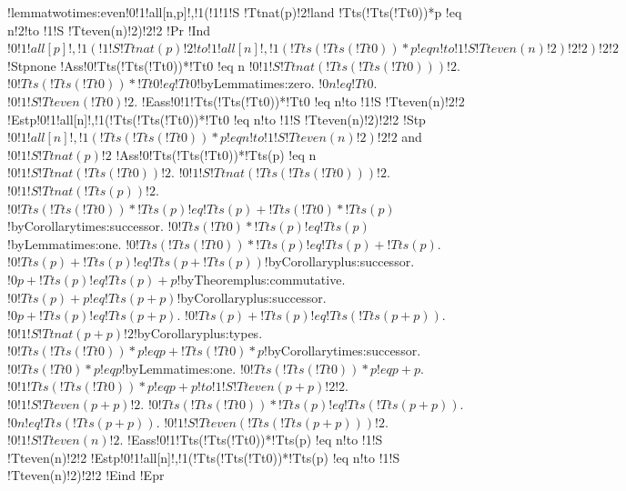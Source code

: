!lemma{twotimes:even}{!0!1!all[n,p]!,!1(!1!1!S !Tt{nat}(p)!2!land !Tt{s}(!Tt{s}(!Tt{0}))*p !eq n!2!to !1!S !Tt{even}(n)!2)!2!2}
!Pr{
!Ind{$!0!1!all[p]!,!1(!1!S !Tt{nat}(p)!2!to !1!all[n]!,!1(!Tt{s}(!Tt{s}(!Tt{0}))*p !eq n!to !1!S !Tt{even}(n)!2)!2!2)!2!2$}
!Stp{none}
!Ass{!0!Tt{s}(!Tt{s}(!Tt{0}))*!Tt{0} !eq n}
$!0!1!S !Tt{nat}(!Tt{s}(!Tt{s}(!Tt{0})))!2$.
$!0!Tt{s}(!Tt{s}(!Tt{0}))*!Tt{0} !eq !Tt{0}$!by{Lemma}{times:zero}.
$!0n !eq !Tt{0}$.
$!0!1!S !Tt{even}(!Tt{0})!2$.
!Eass{!0!1!Tt{s}(!Tt{s}(!Tt{0}))*!Tt{0} !eq n!to !1!S !Tt{even}(n)!2!2}
!Estp{!0!1!all[n]!,!1(!Tt{s}(!Tt{s}(!Tt{0}))*!Tt{0} !eq n!to !1!S !Tt{even}(n)!2)!2!2}
!Stp{$!0!1!all[n]!,!1(!Tt{s}(!Tt{s}(!Tt{0}))*p !eq n!to !1!S !Tt{even}(n)!2)!2!2$ and $!0!1!S !Tt{nat}(p)!2$}
!Ass{!0!Tt{s}(!Tt{s}(!Tt{0}))*!Tt{s}(p) !eq n}
$!0!1!S !Tt{nat}(!Tt{s}(!Tt{0}))!2$.
$!0!1!S !Tt{nat}(!Tt{s}(!Tt{s}(!Tt{0})))!2$.
$!0!1!S !Tt{nat}(!Tt{s}(p))!2$.
$!0!Tt{s}(!Tt{s}(!Tt{0}))*!Tt{s}(p) !eq !Tt{s}(p)+!Tt{s}(!Tt{0})*!Tt{s}(p)$!by{Corollary}{times:successor}.
$!0!Tt{s}(!Tt{0})*!Tt{s}(p) !eq !Tt{s}(p)$!by{Lemma}{times:one}.
$!0!Tt{s}(!Tt{s}(!Tt{0}))*!Tt{s}(p) !eq !Tt{s}(p)+!Tt{s}(p)$.
$!0!Tt{s}(p)+!Tt{s}(p) !eq !Tt{s}(p+!Tt{s}(p))$!by{Corollary}{plus:successor}.
$!0p+!Tt{s}(p) !eq !Tt{s}(p)+p$!by{Theorem}{plus:commutative}.
$!0!Tt{s}(p)+p !eq !Tt{s}(p+p)$!by{Corollary}{plus:successor}.
$!0p+!Tt{s}(p) !eq !Tt{s}(p+p)$.
$!0!Tt{s}(p)+!Tt{s}(p) !eq !Tt{s}(!Tt{s}(p+p))$.
$!0!1!S !Tt{nat}(p+p)!2$!by{Corollary}{plus:types}.
$!0!Tt{s}(!Tt{s}(!Tt{0}))*p !eq p+!Tt{s}(!Tt{0})*p$!by{Corollary}{times:successor}.
$!0!Tt{s}(!Tt{0})*p !eq p$!by{Lemma}{times:one}.
$!0!Tt{s}(!Tt{s}(!Tt{0}))*p !eq p+p$.
$!0!1!Tt{s}(!Tt{s}(!Tt{0}))*p !eq p+p!to !1!S !Tt{even}(p+p)!2!2$.
$!0!1!S !Tt{even}(p+p)!2$.
$!0!Tt{s}(!Tt{s}(!Tt{0}))*!Tt{s}(p) !eq !Tt{s}(!Tt{s}(p+p))$.
$!0n !eq !Tt{s}(!Tt{s}(p+p))$.
$!0!1!S !Tt{even}(!Tt{s}(!Tt{s}(p+p)))!2$.
$!0!1!S !Tt{even}(n)!2$.
!Eass{!0!1!Tt{s}(!Tt{s}(!Tt{0}))*!Tt{s}(p) !eq n!to !1!S !Tt{even}(n)!2!2}
!Estp{!0!1!all[n]!,!1(!Tt{s}(!Tt{s}(!Tt{0}))*!Tt{s}(p) !eq n!to !1!S !Tt{even}(n)!2)!2!2}
!Eind}
!Epr

